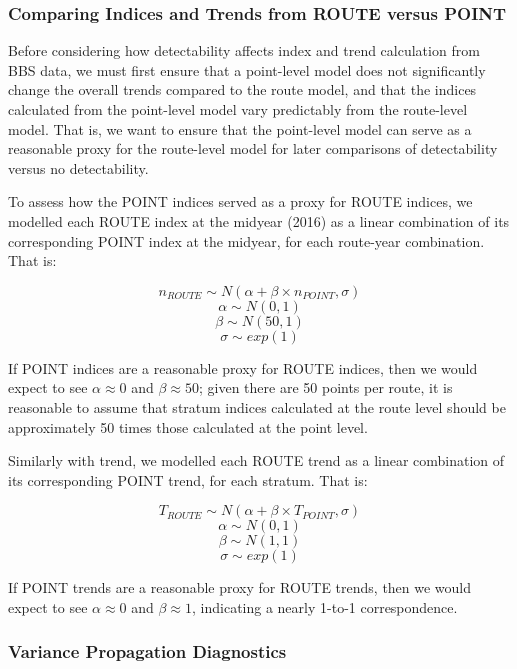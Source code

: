 \subsubsection{Comparing Indices and Trends from ROUTE versus POINT}\label{route-vs-point}

\par Before considering how detectability affects index and trend calculation from BBS data, we must first ensure that a point-level model does not significantly change the overall trends compared to the route model, and that the indices calculated from the point-level model vary predictably from the route-level model.
That is, we want to ensure that the point-level model can serve as a reasonable proxy for the route-level model for later comparisons of detectability versus no detectability.

\par To assess how the POINT indices served as a proxy for ROUTE indices, we modelled each ROUTE index at the midyear (2016) as a linear combination of its corresponding POINT index at the midyear, for each route-year combination. 
That is:

$$	n_{ROUTE} \sim N(\alpha + \beta \times n_{POINT}, \sigma) $$
$$	\alpha \sim N(0,1) $$
$$	\beta \sim N(50, 1) $$
$$	\sigma \sim exp(1)$$

If POINT indices are a reasonable proxy for ROUTE indices, then we would expect to see $\alpha \approx 0$ and $\beta \approx 50$; given there are 50 points per route, it is reasonable to assume that stratum indices calculated at the route level should be approximately 50 times those calculated at the point level.

\par Similarly with trend, we modelled each ROUTE trend as a linear combination of its corresponding POINT trend, for each stratum.
That is:

$$ T_{ROUTE} \sim N(\alpha + \beta \times T_{POINT}, \sigma)$$
$$ \alpha \sim N(0,1) $$
$$ \beta \sim N(1,1) $$
$$ \sigma \sim exp(1) $$

If POINT trends are a reasonable proxy for ROUTE trends, then we would expect to see $\alpha \approx 0$ and $\beta \approx 1$, indicating a nearly 1-to-1 correspondence. 

\subsubsection{Variance Propagation Diagnostics}

